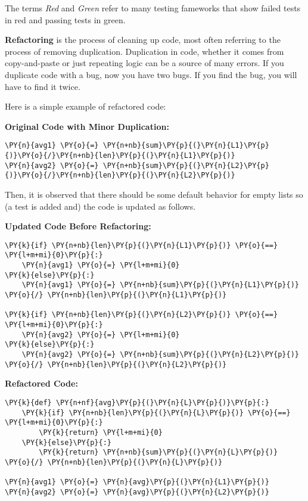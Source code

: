 The terms \emph{Red} and \emph{Green} refer to many testing fameworks that show failed tests in red and passing tests in green.


\textbf{Refactoring} is the process of cleaning up code, most often referring to the process of removing duplication.  Duplication in code, whether it comes from copy-and-paste or just repeating logic can be a source of many errors.  If you duplicate code with a bug, now you have two bugs.  If you find the bug, you will have to find it twice.


Here is a simple example of refactored code:


\textbf{Original Code with Minor Duplication:}

\begin{Verbatim}[commandchars=\\\{\}]
\PY{n}{avg1} \PY{o}{=} \PY{n+nb}{sum}\PY{p}{(}\PY{n}{L1}\PY{p}{)}\PY{o}{/}\PY{n+nb}{len}\PY{p}{(}\PY{n}{L1}\PY{p}{)}
\PY{n}{avg2} \PY{o}{=} \PY{n+nb}{sum}\PY{p}{(}\PY{n}{L2}\PY{p}{)}\PY{o}{/}\PY{n+nb}{len}\PY{p}{(}\PY{n}{L2}\PY{p}{)}
\end{Verbatim}



Then, it is observed that there should be some default behavior for empty lists so (a test is added and) the code is updated as follows.


\textbf{Updated Code Before Refactoring:}

\begin{Verbatim}[commandchars=\\\{\}]
\PY{k}{if} \PY{n+nb}{len}\PY{p}{(}\PY{n}{L1}\PY{p}{)} \PY{o}{==} \PY{l+m+mi}{0}\PY{p}{:}
    \PY{n}{avg1} \PY{o}{=} \PY{l+m+mi}{0}
\PY{k}{else}\PY{p}{:}
    \PY{n}{avg1} \PY{o}{=} \PY{n+nb}{sum}\PY{p}{(}\PY{n}{L1}\PY{p}{)} \PY{o}{/} \PY{n+nb}{len}\PY{p}{(}\PY{n}{L1}\PY{p}{)}

\PY{k}{if} \PY{n+nb}{len}\PY{p}{(}\PY{n}{L2}\PY{p}{)} \PY{o}{==} \PY{l+m+mi}{0}\PY{p}{:}
    \PY{n}{avg2} \PY{o}{=} \PY{l+m+mi}{0}
\PY{k}{else}\PY{p}{:}
    \PY{n}{avg2} \PY{o}{=} \PY{n+nb}{sum}\PY{p}{(}\PY{n}{L2}\PY{p}{)} \PY{o}{/} \PY{n+nb}{len}\PY{p}{(}\PY{n}{L2}\PY{p}{)}
\end{Verbatim}



\textbf{Refactored Code:}

\begin{Verbatim}[commandchars=\\\{\}]
\PY{k}{def} \PY{n+nf}{avg}\PY{p}{(}\PY{n}{L}\PY{p}{)}\PY{p}{:}
    \PY{k}{if} \PY{n+nb}{len}\PY{p}{(}\PY{n}{L}\PY{p}{)} \PY{o}{==} \PY{l+m+mi}{0}\PY{p}{:}
        \PY{k}{return} \PY{l+m+mi}{0}
    \PY{k}{else}\PY{p}{:}
        \PY{k}{return} \PY{n+nb}{sum}\PY{p}{(}\PY{n}{L}\PY{p}{)} \PY{o}{/} \PY{n+nb}{len}\PY{p}{(}\PY{n}{L}\PY{p}{)}

\PY{n}{avg1} \PY{o}{=} \PY{n}{avg}\PY{p}{(}\PY{n}{L1}\PY{p}{)}
\PY{n}{avg2} \PY{o}{=} \PY{n}{avg}\PY{p}{(}\PY{n}{L2}\PY{p}{)}
\end{Verbatim}



